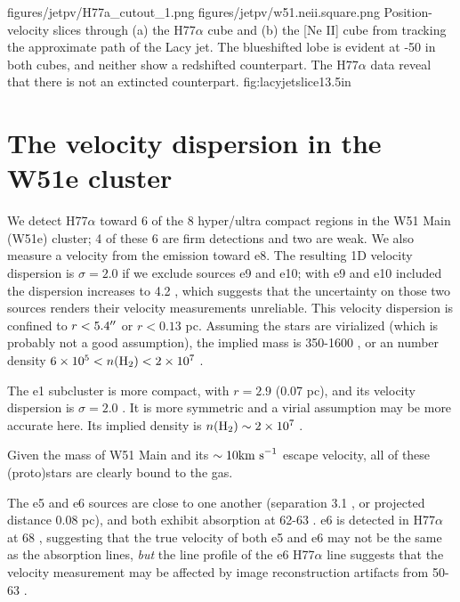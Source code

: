 \FigureTwo
{figures/jetpv/H77a_cutout_1.png}
{figures/jetpv/w51.neii.square.png}
{Position-velocity slices through (a) the H77$\alpha$ cube and (b) the [Ne II]
cube from \citet{Lacy2007a} tracking the approximate path of the Lacy jet.  The
blueshifted lobe is evident at -50 \kms in both cubes, and neither show a
redshifted counterpart.  The H77$\alpha$ data reveal that there is not an
extincted counterpart.}
{fig:lacyjetslice}{1}{3.5in}

\section{The velocity dispersion in the W51e cluster}
We detect H77$\alpha$ toward 6 of the 8 hyper/ultra compact \hii regions in the
W51 Main (W51e) cluster; 4 of these 6 are firm detections and two are weak.  We
also measure a velocity from the \formaldehyde emission toward e8.  The
resulting 1D velocity dispersion is $\sigma=2.0$ \kms if we exclude sources e9
and e10; with e9 and e10 included the dispersion increases to 4.2 \kms, which
suggests that the uncertainty on those two sources renders their velocity
measurements unreliable.  This velocity dispersion is confined to
$r<5.4\mbox{$^{\prime\prime}$}$ or $r<0.13$ pc.  Assuming the stars are virialized (which is
probably not a good assumption), the implied mass is 350-1600 \msun, or an \hh
number density $6\times10^{5} < n(\textrm{H}_{2}) < 2\times10^{7}$ \percc.

The e1 subcluster is more compact, with $r=2.9$ \arcsec (0.07 pc), and its
velocity dispersion is $\sigma=2.0$ \kms.  It is more symmetric and a virial
assumption may be more accurate here.  Its implied density
is $n(\textrm{H}_{2})\sim2\times10^{7}$ \percc.

Given the mass of W51 Main and its $\sim10\textrm{km~s}^{-1}$ escape velocity, all of these
(proto)stars are clearly bound to the gas. 

The e5 and e6 sources are close to one another (separation 3.1 \arcsec, or
projected distance 0.08 pc), and both exhibit \formaldehyde absorption at 62-63
\kms.  e6 is detected in H77$\alpha$ at 68 \kms, suggesting that the true
velocity of both e5 and e6 may not be the same as the \formaldehyde absorption
lines, \emph{but} the line profile of the e6 H77$\alpha$ line suggests that the
velocity measurement may be affected by image reconstruction artifacts from
50-63 \kms.


